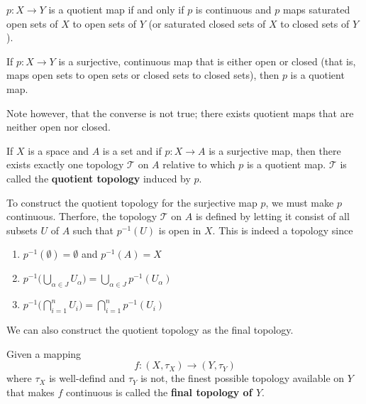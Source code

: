 \documentclass{article}
\begin{document}
    \begin{definition}
    $p: X \longrightarrow Y$ is a quotient map if and only if $p$ is continuous and $p$ maps saturated open sets of $X$ to open sets of $Y$ (or saturated closed sets of $X$ to closed sets of $Y$). 
    \end{definition}

    \begin{proposition}
    If $p: X \longrightarrow Y$ is a surjective, continuous map that is either open or closed (that is, maps open sets to open sets or closed sets to closed sets), then $p$ is a quotient map. 

    Note however, that the converse is not true; there exists quotient maps that are neither open nor closed. 
    \end{proposition}

    \begin{definition}
    If $X$ is a space and $A$ is a set and if $p: X \longrightarrow A$ is a surjective map, then there exists exactly one topology $\mathscr{T}$ on $A$ relative to which $p$ is a quotient map. $\mathscr{T}$ is called the \textbf{quotient topology} induced by $p$. 
    \end{definition}

    To construct the quotient topology for the surjective map $p$, we must make $p$ continuous. Therfore, the topology $\mathscr{T}$ on $A$ is defined by letting it consist of all subsets $U$ of $A$ such that $p^{-1}(U)$ is open in $X$. This is indeed a topology since
    \begin{enumerate}
        \item $p^{-1} (\emptyset) = \emptyset$ and $p^{-1}(A) = X$
        \item $p^{-1} \Big( \bigcup_{\alpha \in J} U_\alpha \Big) = \bigcup_{\alpha \in J} p^{-1} (U_\alpha)$
        \item $p^{-1} \Big( \bigcap_{i=1}^n U_i \Big) = \bigcap_{i=1}^n p^{-1} (U_i)$
    \end{enumerate}

    We can also construct the quotient topology as the final topology. 

    \begin{definition}
    Given a mapping 
    \[f: (X, \tau_X) \longrightarrow (Y, \tau_Y)\]
    where $\tau_X$ is well-defind and $\tau_Y$ is not, the finest possible topology available on $Y$ that makes $f$ continuous is called the \textbf{final topology of $Y$}. 
    \end{definition}
\end{document}
